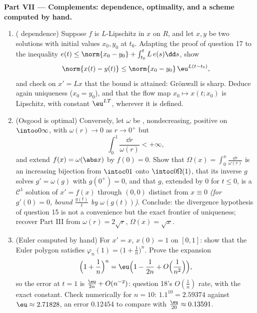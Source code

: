 \begin{problem}[{Weekend problem --- existence of solutions of
$x' = f(t, x)$ without Lipschitz}]
\medskip
\noindent\textbf{Part VII --- Complements: dependence,
optimality, and a scheme computed by hand.}
\begin{enumerate}[resume]
  \item ( dependence) Suppose $f$ is $L$-Lipschitz
        in $x$ on $R$, and let $x, y$ be two solutions with
        initial values $x_0, y_0$ at $t_0$. Adapting the proof
        of question 17 to the inequality $e(t) \leq \norm{x_0
        - y_0} + \int_{t_0}^tL\,e(s)\dd s$, show
        \[
        \norm{x(t) - y(t)} \leq \norm{x_0 - y_0}\,
        \eu^{L(t - t_0)},
        \]
        and check on $x' = Lx$ that the bound is attained:
        Gr\"onwall is sharp. Deduce again uniqueness ($x_0 =
        y_0$), and that the flow map $x_0 \mapsto x(t; x_0)$
        is Lipschitz, with constant $\eu^{LT}$, wherever it is
        defined.
  \item (Osgood is optimal) Conversely, let $\omega$ be
        , nondecreasing, positive on
        $\intoo0\infty$, with $\omega(r) \to 0$ as $r \to 0^+$
        but
        \[
        \int_0^1\frac{\dd r}{\omega(r)} < +\infty,
        \]
        and extend $f(x) = \omega(\abs x)$ by $f(0) = 0$.
        Show that $\Omega(x) = \int_0^x\frac{\dd r}{\omega(r)}$
        is an increasing bijection from $\intoc0{1}$ onto
        $\intoc0{\Omega(1)}$, that its inverse $g$ solves $g'
        = \omega(g)$ with $g(0^+) = 0$, and that $g$, extended
        by $0$ for $t \leq 0$, is a $\mathcal C^1$ solution of
        $x' = f(x)$ through $(0, 0)$ distinct from $x \equiv
        0$ \emph{(for $g'(0) = 0$, bound $\frac{g(t)}t$ by
        $\omega(g(t))$)}. Conclude: the divergence hypothesis
        of question 15 is not a convenience but the exact
        frontier of uniqueness; recover Part III from
        $\omega(r) = 2\sqrt r$, $\Omega(x) = \sqrt x$.
  \item (Euler computed by hand) For $x' = x$, $x(0) = 1$ on
        $[0, 1]$: show that the Euler polygon satisfies
        $\varphi_n(1) = \bigl(1 + \frac1n\bigr)^n$. Prove the
        expansion
        \[
        \Bigl(1 + \frac1n\Bigr)^{n}
        = \eu\Bigl(1 - \frac1{2n} + O\Bigl(\frac1{n^2}\Bigr)
        \Bigr),
        \]
        so the error at $t = 1$ is $\frac{\eu}{2n} +
        O(n^{-2})$: question 18's $O(\frac1n)$ rate, with the
        exact constant. Check numerically for $n = 10$:
        $1.1^{10} = 2.59374$ against $\eu \approx 2.71828$,
        an error $0.12454$ to compare with $\frac{\eu}{20}
        \approx 0.13591$.
\end{enumerate}
\end{problem}

